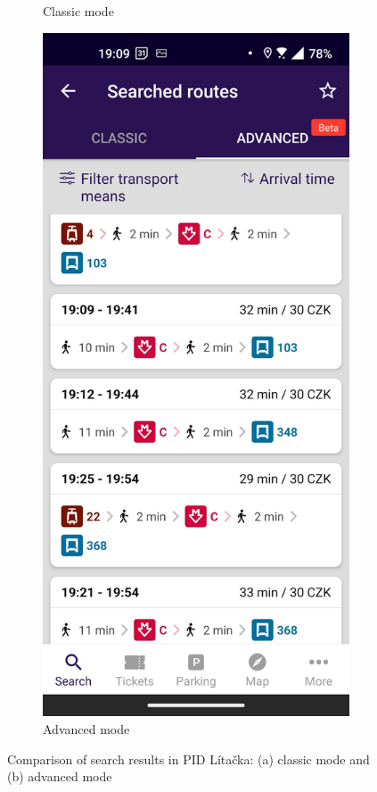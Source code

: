 \begin{figure}[h!]
\begin{subfigure}{.45\textwidth}
    \caption{Classic mode}
    \label{litacka_classic}
  \end{subfigure}%
  \hfill
  \begin{subfigure}{.45\textwidth}
  \centering
    \includegraphics[width=\linewidth]{img/screenshots/pid_litacka_result_extended.jpg}
    \caption{Advanced mode}
    \label{litacka_advanced}
  \end{subfigure}
  \caption[Comparison of search results in PID Lítačka]{Comparison of search results in PID Lítačka: (a) classic mode and (b) advanced mode}
  \label{litacka}
\end{figure}

